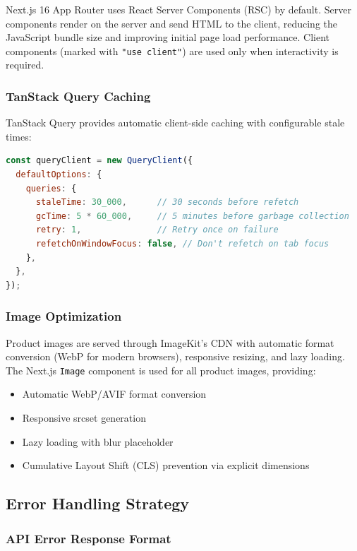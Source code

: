 \documentclass[12pt,onecolumn]{IEEEtran}
\begin{document}
Next.js 16 App Router uses React Server Components (RSC) by default. Server components render on the server and send HTML to the client, reducing the JavaScript bundle size and improving initial page load performance. Client components (marked with \texttt{"use client"}) are used only when interactivity is required.

\subsubsection{TanStack Query Caching}

TanStack Query provides automatic client-side caching with configurable stale times:

\begin{lstlisting}[language=JavaScript,caption={TanStack Query configuration}]
const queryClient = new QueryClient({
  defaultOptions: {
    queries: {
      staleTime: 30_000,      // 30 seconds before refetch
      gcTime: 5 * 60_000,     // 5 minutes before garbage collection
      retry: 1,               // Retry once on failure
      refetchOnWindowFocus: false, // Don't refetch on tab focus
    },
  },
});
\end{lstlisting}

\subsubsection{Image Optimization}

Product images are served through ImageKit's CDN with automatic format conversion (WebP for modern browsers), responsive resizing, and lazy loading. The Next.js \texttt{Image} component is used for all product images, providing:
\begin{itemize}[leftmargin=1.5em]
  \item Automatic WebP/AVIF format conversion
  \item Responsive srcset generation
  \item Lazy loading with blur placeholder
  \item Cumulative Layout Shift (CLS) prevention via explicit dimensions
\end{itemize}

\subsection{Error Handling Strategy}

\subsubsection{API Error Response Format}
\end{document}
